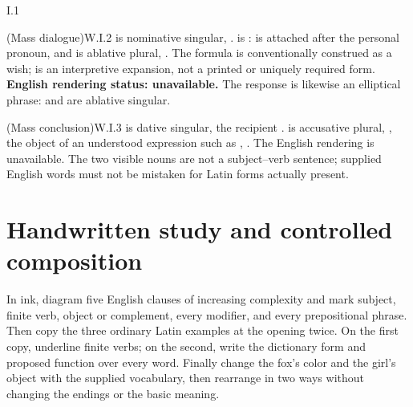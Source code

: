 \begin{courseunit}{I.1}
\begin{workedexample}{ (Mass dialogue)}{W.I.2}
 is nominative singular, . 
is :  is attached after the personal pronoun, and
 is ablative plural, . The formula is
conventionally construed as a wish; \Latin{[sit]} is an interpretive expansion,
not a printed or uniquely required form.
\textbf{English rendering status: unavailable.}
The response  is likewise an elliptical phrase:
 and  are ablative singular.
\end{workedexample}

\begin{workedexample}{ (Mass conclusion)}{W.I.3}
 is dative singular, the recipient .
 is accusative plural, , the object of an
understood expression such as , . The English
rendering is unavailable. The two visible nouns are not a
subject--verb sentence; supplied English words must not be mistaken for Latin
forms actually present.
\end{workedexample}

\section{Handwritten study and controlled composition}

In ink, diagram five English clauses of increasing complexity and mark subject,
finite verb, object or complement, every modifier, and every prepositional
phrase. Then copy the three ordinary Latin examples at the opening twice. On the first copy,
underline finite verbs; on the second, write the dictionary form and proposed
function over every word. Finally change the fox's color and the girl's object
with the supplied vocabulary, then rearrange  in
two ways without changing the endings or the basic meaning.




\end{courseunit}

